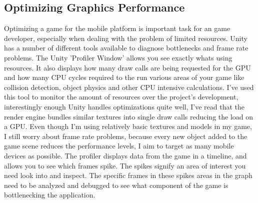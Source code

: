 \subsection{Optimizing Graphics Performance}
Optimizing a game for the mobile platform is important task for an game developer, especially when dealing with the problem of limited resources.
Unity has a number of different tools available to diagnose bottlenecks and frame rate problems. The Unity 'Profiler Window' allows you see exactly whats using resources. It also displays how many draw calls are being requested for the GPU and how many CPU cycles required to the run various areas of your game like collision detection, object physics and other CPU intensive calculations. I've used this tool to monitor the amount of resources over the project's development, interestingly enough Unity handles optimizations quite well, I've read that the render engine bundles similar textures into single draw calls reducing the load on a GPU. Even though I'm using relatively basic textures and models in my game, I still worry about frame rate problems, because every new object added to the game scene reduces the performance levels, I aim to target as many mobile devices as possible. The profiler displays data from the game in a timeline, and allows you to see which frames spike. The spikes signify an area of interest you need look into and inspect. The specific frames in these spikes areas in the graph need to be analyzed and debugged to see what component of the game is bottlenecking the application.
